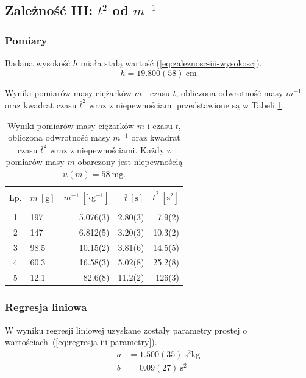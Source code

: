 \documentclass[twocolumn, a4paper, polish, 10pt]{article}
\begin{document}
\subsection{Zależność III: \texorpdfstring{$t^2$}{t²} od \texorpdfstring{$m^{-1}$}{1/m}}
\subsubsection{Pomiary}
Badana wysokość $h$ miała stałą wartość (\ref{eq:zaleznosc-iii-wysokosc}).
\begin{equation}
    h = 19.800(58)~\mathrm{cm}
    \label{eq:zaleznosc-iii-wysokosc}
\end{equation}

Wyniki pomiarów masy ciężarków $m$ i czasu $\bar{t}$, obliczona odwrotność masy $m^{-1}$ oraz kwadrat czasu $\bar{t}^2$ wraz z niepewnościami przedstawione są w Tabeli \ref{tab:zaleznosc-iii}.
\begin{table}[ht]
\begin{center}
\renewcommand*{\tablename}{Tabela}
\caption{\small Wyniki pomiarów masy ciężarków $m$ i czasu $\bar{t}$, obliczona odwrotność masy $m^{-1}$ oraz kwadrat czasu $\bar{t}^2$ wraz z niepewnościami.
Każdy z pomiarów masy $m$ obarczony jest niepewnością $u(m) = 58~\mathrm{mg}$.\vspace{0.15cm}
    \label{tab:zaleznosc-iii}}
    {\small
    \begin{tabular}{c l r r r}
    \hline \vspace{-0.35cm} \\
      Lp.
      & $m~[\mathrm{g}]$ & $m^{-1}~[\mathrm{kg^{-1}}]$
      & $\bar{t}~[\mathrm{s}]$ & $\bar{t}^2~[\mathrm{s^2}]$ \\
      \hline \vspace{-0.2cm} \\
      1 & 197 & 5.076(3) & 2.80(3) & 7.9(2) \\
      2 & 147 & 6.812(5) & 3.20(3) & 10.3(2) \\
      3 & 98.5 & 10.15(2) & 3.81(6) & 14.5(5) \\
      4 & 60.3 & 16.58(3) & 5.02(8) & 25.2(8) \\
      5 & 12.1 & 82.6(8) & 11.2(2) & 126(3) \\
    
\hline
    \end{tabular}}
    \end{center}
\end{table}

\subsubsection{Regresja liniowa}
W wyniku regresji liniowej uzyskane zostały parametry prostej o wartościach~(\ref{eq:regresja-iii-parametry}).
\begin{equation}
\begin{split}
    a &= 1.500(35)~\mathrm{ s^2 kg } \\
    b &= 0.09(27)~\mathrm{s^2}
    \label{eq:regresja-iii-parametry}
\end{split}
\end{equation}
\end{document}
